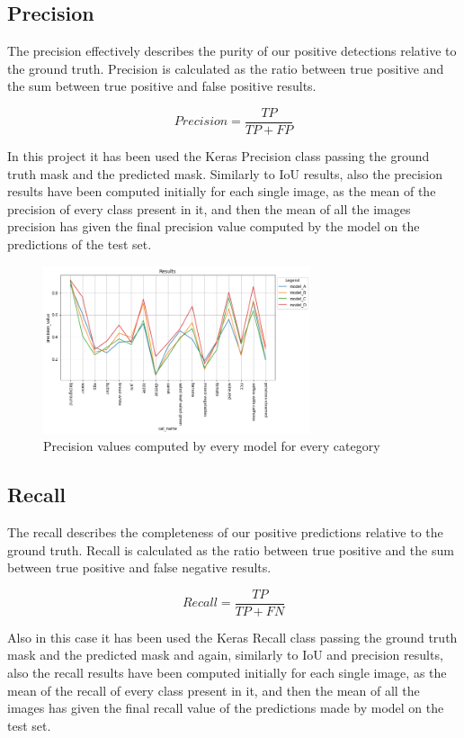\documentclass[a4paper,10pt]{report}
\begin{document}
\clearpage\subsection{Precision}\label{subsec:subsection-512}

The precision effectively describes the purity of our positive detections relative to the ground truth. Precision is calculated as the ratio between true positive and the sum between true positive and false positive results. 


\[Precision = \frac{TP}{TP + FP}\]

In this project it has been used the Keras Precision class passing the ground truth mask and the predicted mask.
Similarly to IoU results, also the precision results have been computed initially for each single image, as the mean of the precision of every class present in it, and then the mean of all the images precision has given the final precision value computed by the model on the predictions of the test set.

\begin{figure}[h]
    \centering
    \includegraphics[width=0.7\textwidth]{assets/img/cat_prec.png}
    \caption{Precision values computed by every model for every category}
    \label{fig:cat_prec}
\end{figure}

\clearpage\subsection{Recall}\label{subsec:subsection-513}
The recall describes the completeness of our positive predictions relative to the ground truth. Recall is calculated as the ratio between true positive and the sum between true positive and false negative results. 


\[Recall = \frac{TP}{TP + FN}\]

Also in this case it has been used the Keras Recall class passing the ground truth mask and the predicted mask and again, similarly to IoU and precision results, also the recall results have been computed initially for each single image, as the mean of the recall of every class present in it, and then the mean of all the images has given the final recall value of the predictions made by model on the test set.
\end{document}
